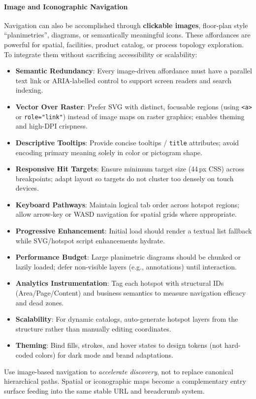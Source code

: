 \paragraph{Image and Iconographic Navigation}\label{sec:image-nav}
Navigation can also be accomplished through \textbf{clickable images}, floor-plan style ``planimetries'', diagrams, or semantically meaningful icons. These affordances are powerful for spatial, facilities, product catalog, or process topology exploration. To integrate them without sacrificing accessibility or scalability:
\begin{itemize}
	\item \textbf{Semantic Redundancy}: Every image-driven affordance must have a parallel text link or ARIA-labelled control to support screen readers and search indexing.
	\item \textbf{Vector Over Raster}: Prefer SVG with distinct, focusable regions (using \texttt{<a>} or \texttt{role="link"}) instead of image maps on raster graphics; enables theming and high-DPI crispness.
	\item \textbf{Descriptive Tooltips}: Provide concise tooltips / \texttt{title} attributes; avoid encoding primary meaning solely in color or pictogram shape.
	\item \textbf{Responsive Hit Targets}: Ensure minimum target size (44\,px CSS) across breakpoints; adapt layout so targets do not cluster too densely on touch devices.
	\item \textbf{Keyboard Pathways}: Maintain logical tab order across hotspot regions; allow arrow-key or WASD navigation for spatial grids where appropriate.
	\item \textbf{Progressive Enhancement}: Initial load should render a textual list fallback while SVG/hotspot script enhancements hydrate.
	\item \textbf{Performance Budget}: Large planimetric diagrams should be chunked or lazily loaded; defer non-visible layers (e.g., annotations) until interaction.
	\item \textbf{Analytics Instrumentation}: Tag each hotspot with structural IDs (Area/Page/Content) and business semantics to measure navigation efficacy and dead zones.
	\item \textbf{Scalability}: For dynamic catalogs, auto-generate hotspot layers from the \wbol{} structure rather than manually editing coordinates.
	\item \textbf{Theming}: Bind fills, strokes, and hover states to design tokens (not hard-coded colors) for dark mode and brand adaptations.
\end{itemize}
Use image-based navigation to \emph{accelerate discovery}, not to replace canonical hierarchical paths. Spatial or iconographic maps become a complementary entry surface feeding into the same stable URL and breadcrumb system.

